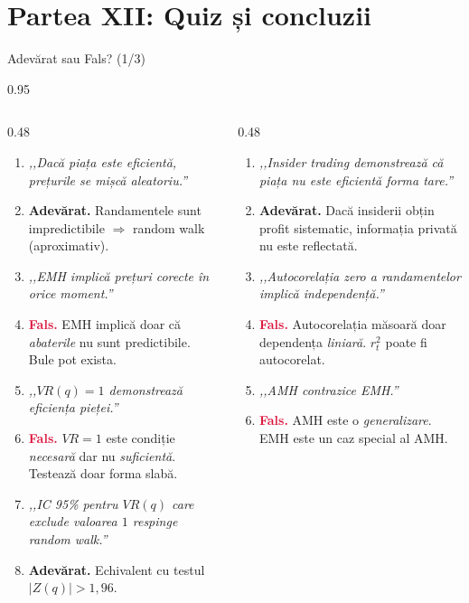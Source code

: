 \documentclass[9pt, aspectratio=169, t]{beamer}
\begin{document}
\section{Partea XII: Quiz și concluzii}

\begin{frame}[shrink=15]{Adevărat sau Fals? (1/3)}
\begin{cminipage}{0.95\textwidth}
\footnotesize
\begin{columns}[T]
\begin{column}{0.48\textwidth}
\begin{enumerate}\setlength{\itemsep}{1pt}
    \item \textit{,,Dacă piața este eficientă, prețurile se mișcă aleatoriu.''}
    \item[] \textcolor{Forest}{\textbf{Adevărat.}} Randamentele sunt impredictibile $\Rightarrow$ random walk (aproximativ).

    \item \textit{,,EMH implică prețuri corecte în orice moment.''}
    \item[] \textcolor{Crimson}{\textbf{Fals.}} EMH implică doar că \textit{abaterile} nu sunt predictibile. Bule pot exista.

    \item \textit{,,$VR(q) = 1$ demonstrează eficiența pieței.''}
    \item[] \textcolor{Crimson}{\textbf{Fals.}} $VR=1$ este condiție \textit{necesară} dar nu \textit{suficientă}. Testează doar forma slabă.

    \item \textit{,,IC 95\% pentru $VR(q)$ care exclude valoarea $1$ respinge random walk.''}
    \item[] \textcolor{Forest}{\textbf{Adevărat.}} Echivalent cu testul $|Z(q)| > 1{,}96$.
\end{enumerate}
\end{column}
\begin{column}{0.48\textwidth}
\begin{enumerate}\setlength{\itemsep}{1pt}
    \setcounter{enumi}{4}
    \item \textit{,,Insider trading demonstrează că piața nu este eficientă forma tare.''}
    \item[] \textcolor{Forest}{\textbf{Adevărat.}} Dacă insiderii obțin profit sistematic, informația privată nu este reflectată.

    \item \textit{,,Autocorelația zero a randamentelor implică independență.''}
    \item[] \textcolor{Crimson}{\textbf{Fals.}} Autocorelația măsoară doar dependența \textit{liniară}. $r_t^2$ poate fi autocorelat.

    \item \textit{,,AMH contrazice EMH.''}
    \item[] \textcolor{Crimson}{\textbf{Fals.}} AMH este o \textit{generalizare}. EMH este un caz special al AMH.
\end{enumerate}
\end{column}
\end{columns}
\end{cminipage}
\end{frame}
\end{document}
